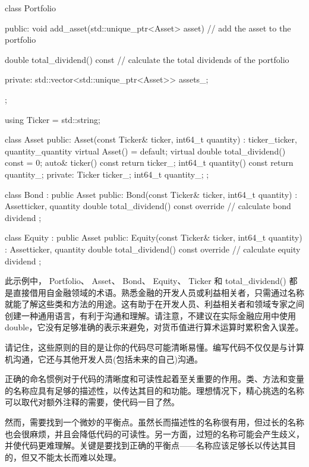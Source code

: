 \begin{cpp}
class Portfolio {
public:
    void add_asset(std::unique_ptr<Asset> asset) {
        // add the asset to the portfolio
    }

    double total_dividend() const {
        // calculate the total dividends of the portfolio
    }

private:
    std::vector<std::unique_ptr<Asset>> assets_;
};

using Ticker = std::string;

class Asset {
public:
    Asset(const Ticker& ticker, int64_t quantity) :
        ticker_{ticker},
        quantity_{quantity} {}
    virtual Asset() = default;
    virtual double total_dividend() const = 0;
    auto& ticker() const { return ticker_; }
    int64_t quantity() const { return quantity_; }
private:
    Ticker ticker_;
    int64_t quantity_;
};

class Bond : public Asset {
public:
    Bond(const Ticker& ticker, int64_t quantity) :
        Asset{ticker, quantity} {}
    double total_dividend() const override {
        // calculate bond dividend
    }
};

class Equity : public Asset {
public:
    Equity(const Ticker& ticker, int64_t quantity) :
        Asset{ticker, quantity} {}
    double total_dividend() const override {
        // calculate equity dividend
    }
};
\end{cpp}

此示例中， Portfolio、 Asset、 Bond、 Equity、 Ticker 和 total\_dividend() 都是直接借用自金融领域的术语。熟悉金融的开发人员或利益相关者，只需通过名称就能了解这些类和方法的用途。这有助于在开发人员、利益相关者和领域专家之间创建一种通用语言，有利于沟通和理解。请注意，不建议在实际金融应用中使用 double，它没有足够准确的表示来避免，对货币值进行算术运算时累积舍入误差。

请记住，这些原则的目的是让你的代码尽可能清晰易懂。编写代码不仅仅是与计算机沟通，它还与其他开发人员(包括未来的自己)沟通。


正确的命名惯例对于代码的清晰度和可读性起着至关重要的作用。类、方法和变量的名称应具有足够的描述性，以传达其目的和功能。理想情况下，精心挑选的名称可以取代对额外注释的需要，使代码一目了然。

然而，需要找到一个微妙的平衡点。虽然长而描述性的名称很有用，但过长的名称也会很麻烦，并且会降低代码的可读性。另一方面，过短的名称可能会产生歧义，并使代码更难理解。关键是要找到正确的平衡点——名称应该足够长以传达其目的，但又不能太长而难以处理。

